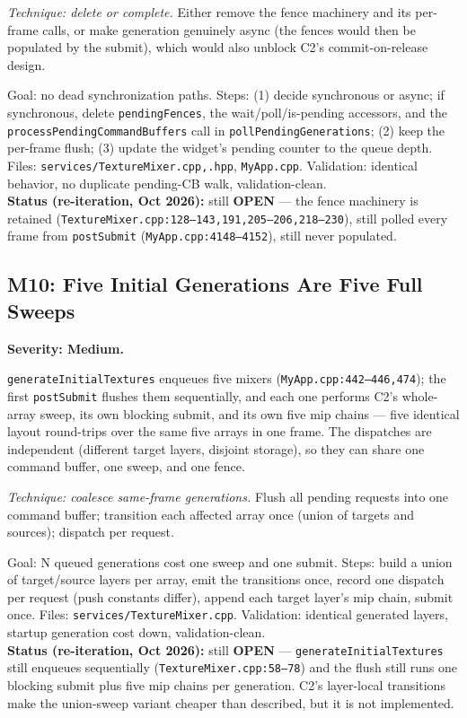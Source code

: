\documentclass[11pt,a4paper]{article}
\begin{document}
\textit{Technique: delete or complete.} Either remove the fence machinery and
its per-frame calls, or make generation genuinely async (the fences would then
be populated by the submit), which would also unblock C2's commit-on-release
design.

\begin{tcolorbox}[promptbox={Prompt --- M9: one story for mixer synchronization}]
Goal: no dead synchronization paths. Steps: (1) decide synchronous or async;
if synchronous, delete \texttt{pendingFences}, the wait/poll/is-pending
accessors, and the \texttt{processPendingCommandBuffers} call in
\texttt{pollPendingGenerations}; (2) keep the per-frame flush;
(3) update the widget's pending counter to the queue depth. Files:
\texttt{services/TextureMixer.cpp,.hpp}, \texttt{MyApp.cpp}. Validation:
identical behavior, no duplicate pending-CB walk, validation-clean.
\\ \textbf{Status (re-iteration, Oct 2026):} still \textbf{OPEN} --- the fence
machinery is retained (\texttt{TextureMixer.cpp:128--143,191,205--206,218--230}),
still polled every frame from \texttt{postSubmit} (\texttt{MyApp.cpp:4148--4152}),
still never populated.
\end{tcolorbox}

\subsection{M10: Five Initial Generations Are Five Full Sweeps}
\label{sec:m10}

\textbf{Severity: Medium.}

\texttt{generateInitialTextures} enqueues five mixers
(\texttt{MyApp.cpp:442--446,474}); the first \texttt{postSubmit} flushes them
sequentially, and each one performs C2's whole-array sweep, its own blocking
submit, and its own five mip chains --- five identical layout round-trips over
the same five arrays in one frame. The dispatches are independent (different
target layers, disjoint storage), so they can share one command buffer, one
sweep, and one fence.

\textit{Technique: coalesce same-frame generations.} Flush all pending
requests into one command buffer; transition each affected array once
(union of targets and sources); dispatch per request.

\begin{tcolorbox}[promptbox={Prompt --- M10: batch the initial generations}]
Goal: N queued generations cost one sweep and one submit. Steps: build a union
of target/source layers per array, emit the transitions once, record one
dispatch per request (push constants differ), append each target layer's mip
chain, submit once. Files: \texttt{services/TextureMixer.cpp}. Validation:
identical generated layers, startup generation cost down, validation-clean.
\\ \textbf{Status (re-iteration, Oct 2026):} still \textbf{OPEN} ---
\texttt{generateInitialTextures} still enqueues sequentially
(\texttt{TextureMixer.cpp:58--78}) and the flush still runs one blocking
submit plus five mip chains per generation. C2's layer-local transitions make
the union-sweep variant cheaper than described, but it is not implemented.
\end{tcolorbox}
\end{document}

